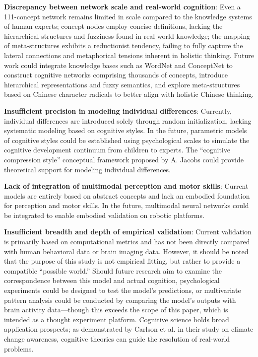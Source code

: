 \documentclass[10pt,onecolumn]{article}
\begin{document}
\textbf{Discrepancy between network scale and real-world cognition}: Even a 111-concept network remains limited in scale compared to the knowledge systems of human experts; concept nodes employ concise definitions, lacking the hierarchical structures and fuzziness found in real-world knowledge; the mapping of meta-structures exhibits a reductionist tendency, failing to fully capture the lateral connections and metaphorical tensions inherent in holistic thinking. Future work could integrate knowledge bases such as WordNet and ConceptNet to construct cognitive networks comprising thousands of concepts, introduce hierarchical representations and fuzzy semantics, and explore meta-structures based on Chinese character radicals to better align with holistic Chinese thinking.

\textbf{Insufficient precision in modeling individual differences}: Currently, individual differences are introduced solely through random initialization, lacking systematic modeling based on cognitive styles. In the future, parametric models of cognitive styles could be established using psychological scales to simulate the cognitive development continuum from children to experts. The “cognitive compression style” conceptual framework proposed by A. Jacobs \cite{jacobs2026cognitive} could provide theoretical support for modeling individual differences.

\textbf{Lack of integration of multimodal perception and motor skills}: Current models are entirely based on abstract concepts and lack an embodied foundation for perception and motor skills. In the future, multimodal neural networks could be integrated to enable embodied validation on robotic platforms.

\textbf{Insufficient breadth and depth of empirical validation}: Current validation is primarily based on computational metrics and has not been directly compared with human behavioral data or brain imaging data. However, it should be noted that the purpose of this study is not empirical fitting, but rather to provide a compatible “possible world.” Should future research aim to examine the correspondence between this model and actual cognition, psychological experiments could be designed to test the model’s predictions, or multivariate pattern analysis could be conducted by comparing the model’s outputs with brain activity data—though this exceeds the scope of this paper, which is intended as a thought experiment platform. Cognitive science holds broad application prospects; as demonstrated by Carlson et al. \cite{carlson2025attending} in their study on climate change awareness, cognitive theories can guide the resolution of real-world problems.
\end{document}
